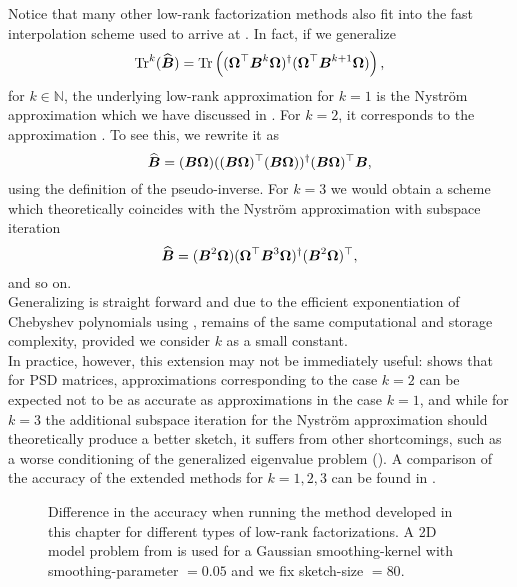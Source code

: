 Notice that many other low-rank factorization methods \cite{halko2011finding,tropp2023randomized}
also fit into the fast interpolation scheme used to arrive at .
In fact, if we generalize
\begin{equation}
    \operatorname{Tr}^{k}(\widehat{\boldsymbol{B}})
        = \operatorname{Tr}\left((\boldsymbol{\Omega}^{\top} \boldsymbol{B}^k \boldsymbol{\Omega})^{\dagger} (\boldsymbol{\Omega}^{\top} \boldsymbol{B}^{k+1} \boldsymbol{\Omega}) \right),
    \label{equ:3-nystrom-trace-generalization}
\end{equation}
for $k \in \mathbb{N}$,
the underlying low-rank approximation for $k=1$ is the Nystr\"om approximation
which we have discussed in .
For $k=2$, it corresponds to the approximation .
To see this, we rewrite it as
\begin{equation}
    \widehat{\boldsymbol{B}} = (\boldsymbol{B} \boldsymbol{\Omega}) ((\boldsymbol{B} \boldsymbol{\Omega})^{\top} (\boldsymbol{B} \boldsymbol{\Omega}))^{\dagger} (\boldsymbol{B} \boldsymbol{\Omega})^{\top} \boldsymbol{B},
    \label{equ:3-nystrom-RSVD-rewritten}
\end{equation}
using the definition of the pseudo-inverse.
For $k=3$ we would obtain a scheme which theoretically coincides with the Nystr\"om
approximation with subspace iteration \cite{tropp2023randomized}
\begin{equation}
    \widehat{\boldsymbol{B}} = (\boldsymbol{B}^2 \boldsymbol{\Omega}) (\boldsymbol{\Omega}^{\top} \boldsymbol{B}^3 \boldsymbol{\Omega})^{\dagger} (\boldsymbol{B}^2 \boldsymbol{\Omega})^{\top},
    \label{equ:3-nystrom-nystrom-SI}
\end{equation}
and so on.\\

Generalizing  is straight forward and
due to the efficient exponentiation of Chebyshev polynomials using
, remains of the same
computational and storage complexity, provided we consider $k$ as a small constant.\\

In practice, however, this extension may not be immediately useful: \cite[lemma~5.2]{tropp2023randomized}
shows that for \gls{PSD} matrices, approximations corresponding to the case $k=2$
can be expected not to be as accurate as approximations in the case $k=1$, and
while for $k=3$ the additional subspace iteration for the Nystr\"om approximation
should theoretically produce a better sketch, it suffers from other shortcomings,
such as a worse conditioning of the generalized eigenvalue problem ().
A comparison of the accuracy of the extended methods for $k=1, 2, 3$ can be
found in .

\begin{figure}[ht]
    \centering
    
    \caption{Difference in the accuracy when running the method developed in this
    chapter for different types of low-rank factorizations.
    A 2D model problem from 
    is used for a Gaussian \gls{smoothing-kernel} with \gls{smoothing-parameter} $=0.05$
    and we fix \gls{sketch-size} $=80$.}
    \label{fig:3-nystrom-other-approximations}
\end{figure}
